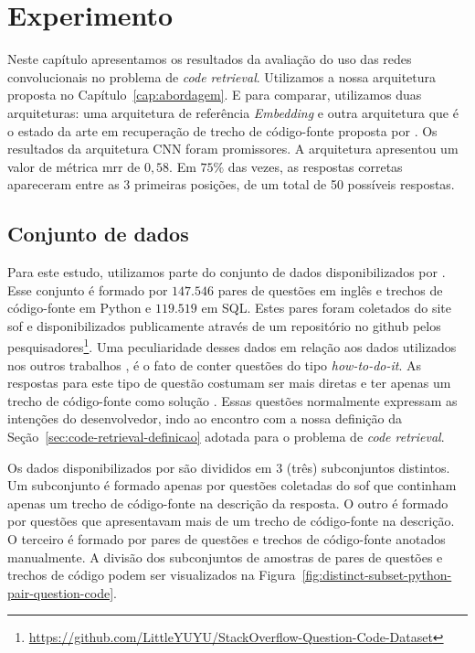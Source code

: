 \chapter{Experimento}
\label{cap:experimento}

Neste capítulo apresentamos os resultados da avaliação do uso das redes convolucionais no problema de \textit{code retrieval}. Utilizamos a nossa arquitetura proposta no Capítulo~\ref{cap:abordagem}. E para comparar, utilizamos duas arquiteturas: uma arquitetura de referência \textit{Embedding} e outra arquitetura que é o estado da arte em recuperação de trecho de código-fonte proposta por \cite{cambronero-deep-learning-code-search:2019}. Os resultados da arquitetura CNN foram promissores. A arquitetura apresentou um valor de métrica \acrfull{mrr} de $0,58$.  Em $75\%$ das vezes, as respostas corretas apareceram entre as 3 primeiras posições, de um total de 50 possíveis respostas. 

\section{Conjunto de dados}
\label{sec:conjunto-dados}

Para este estudo, utilizamos parte do conjunto de dados disponibilizados por \cite{yao-2018}. Esse conjunto é formado por $\bm{147.546}$ pares de questões em inglês e trechos de código-fonte em Python e $\bm{119.519}$ em SQL. Estes pares foram coletados do site \Gls{sof} e disponibilizados publicamente através de um repositório no \Gls{github} pelos pesquisadores\footnote{\url{https://github.com/LittleYUYU/StackOverflow-Question-Code-Dataset}}. Uma peculiaridade desses dados em relação aos dados utilizados nos outros trabalhos \cite{iyer-etal-2016-summarizing, Allamanis-bimodal-source-code-natural-language:2015}, é o fato de conter questões do tipo \textit{how-to-do-it}. As respostas para este tipo de questão costumam ser mais diretas e ter apenas um trecho de código-fonte como solução \citep{yao-2018}. Essas questões normalmente expressam as intenções do desenvolvedor, indo ao encontro com a nossa definição da Seção~\ref{sec:code-retrieval-definicao} adotada para o problema de \textit{code retrieval}.

Os dados disponibilizados por \cite{yao-2018} são divididos em 3 (três) subconjuntos distintos. Um subconjunto é formado apenas por questões coletadas do \Gls{sof} que continham apenas um trecho de código-fonte na descrição da resposta. O outro é formado por questões que apresentavam mais de um trecho de código-fonte na descrição. O terceiro é formado por pares de questões e trechos de código-fonte anotados manualmente. A divisão dos subconjuntos de amostras de pares de questões e trechos de código podem ser visualizados na Figura~\ref{fig:distinct-subset-python-pair-question-code}.

